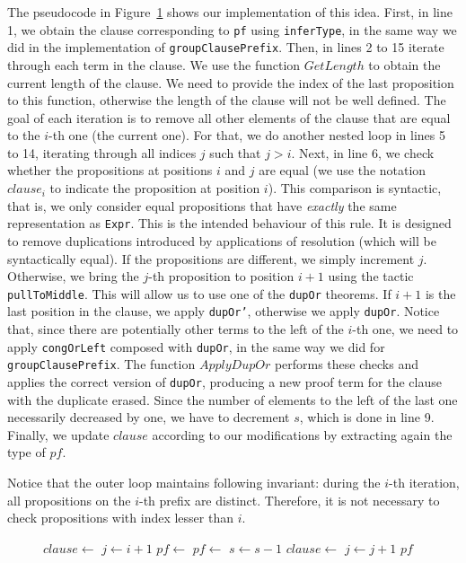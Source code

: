The pseudocode in Figure~\ref{factorCore} shows our implementation of this idea.
First, in line 1, we obtain the clause corresponding to \texttt{pf} using \texttt{inferType},
in the same way we did in the implementation of \texttt{groupClausePrefix}. Then, in lines 2
to 15 iterate through each term in the clause.
We use the function $GetLength$ to obtain the current length of the clause. We need to
provide the index of the last proposition to this function, otherwise the length of the clause
will not be well defined.
The goal of each iteration is to remove all other elements of the clause that are equal to
the $i$-th one (the current one). For that, we do another nested loop in lines 5 to 14,
iterating through all indices $j$ such that $j > i$. Next, in line 6, we check whether
the propositions at positions $i$ and $j$ are equal (we use the notation $clause_{i}$ to
indicate the proposition at position $i$). This comparison is syntactic, that is, we
only consider equal propositions that have \textit{exactly} the same representation
as \texttt{Expr}. This is the intended behaviour of this rule. It is designed to
remove duplications introduced by applications of resolution (which will be syntactically equal).
If the propositions are different, we simply increment $j$. Otherwise,
we bring the $j$-th proposition to position $i + 1$ using the tactic \texttt{pullToMiddle}.
This will allow us to use one of the \texttt{dupOr} theorems. If $i + 1$ is the last
position in the clause, we apply \texttt{dupOr'}, otherwise we apply \texttt{dupOr}.
Notice that, since there are potentially other terms to the left of the $i$-th one,
we need to apply \texttt{congOrLeft} composed with \texttt{dupOr}, in the same way we
did for \texttt{groupClausePrefix}. The function $ApplyDupOr$ performs these checks
and applies the correct version of \texttt{dupOr}, producing a new proof term for the clause
with the duplicate erased. Since the number of elements to the left
of the last one necessarily decreased by one, we have to decrement $s$,
which is done in line 9. Finally, we update $clause$
according to our modifications by extracting again the type of $pf$.

Notice that the outer loop maintains following invariant: during the $i$-th iteration,
all propositions on the $i$-th prefix are distinct. Therefore, it is not necessary to
check propositions with index lesser than $i$.

\begin{figure}[t]
\begin{algorithmic}[1]
  \State $clause \gets $ 
    \State $j \gets i + 1$
        \State $pf \gets $ 
        \State $pf \gets $ 
        \State $s \gets s - 1$
        \State $clause \gets $ 
      \Else
        \State $j \gets j + 1$
      \EndIf
    \EndWhile
  \EndFor
  \State \Return $pf$
\EndFunction
\end{algorithmic}\label{factorCore}
\end{figure}

